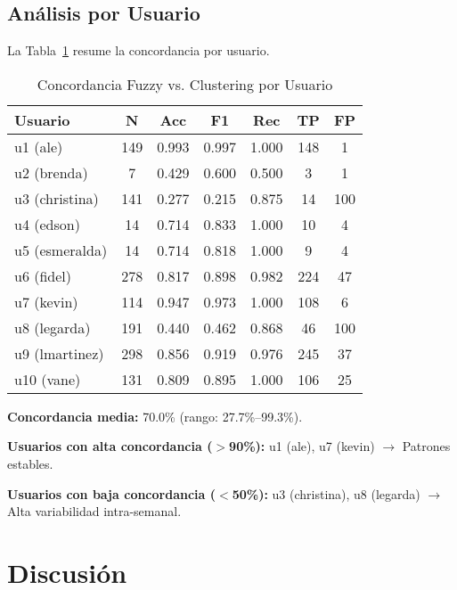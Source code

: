 \documentclass[12pt,a4paper,twoside]{article}
\begin{document}
\subsection{Análisis por Usuario}

La Tabla~\ref{tab:per_user} resume la concordancia por usuario.

\begin{table}[h]
\centering
\caption{Concordancia Fuzzy vs. Clustering por Usuario}
\label{tab:per_user}
\small
\begin{tabular}{lcccccc}
\toprule
\textbf{Usuario} & \textbf{N} & \textbf{Acc} & \textbf{F1} & \textbf{Rec} & \textbf{TP} & \textbf{FP} \\
\midrule
u1 (ale) & 149 & 0.993 & 0.997 & 1.000 & 148 & 1 \\
u2 (brenda) & 7 & 0.429 & 0.600 & 0.500 & 3 & 1 \\
u3 (christina) & 141 & 0.277 & 0.215 & 0.875 & 14 & 100 \\
u4 (edson) & 14 & 0.714 & 0.833 & 1.000 & 10 & 4 \\
u5 (esmeralda) & 14 & 0.714 & 0.818 & 1.000 & 9 & 4 \\
u6 (fidel) & 278 & 0.817 & 0.898 & 0.982 & 224 & 47 \\
u7 (kevin) & 114 & 0.947 & 0.973 & 1.000 & 108 & 6 \\
u8 (legarda) & 191 & 0.440 & 0.462 & 0.868 & 46 & 100 \\
u9 (lmartinez) & 298 & 0.856 & 0.919 & 0.976 & 245 & 37 \\
u10 (vane) & 131 & 0.809 & 0.895 & 1.000 & 106 & 25 \\
\bottomrule
\end{tabular}
\end{table}

\textbf{Concordancia media:} 70.0\% (rango: 27.7\%--99.3\%).

\textbf{Usuarios con alta concordancia ($>$90\%):} u1 (ale), u7 (kevin) $\rightarrow$ Patrones estables.

\textbf{Usuarios con baja concordancia ($<$50\%):} u3 (christina), u8 (legarda) $\rightarrow$ Alta variabilidad intra-semanal.


\section{Discusión}
\end{document}
